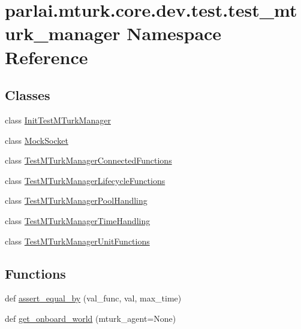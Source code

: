 \hypertarget{namespaceparlai_1_1mturk_1_1core_1_1dev_1_1test_1_1test__mturk__manager}{}\section{parlai.\+mturk.\+core.\+dev.\+test.\+test\+\_\+mturk\+\_\+manager Namespace Reference}
\label{namespaceparlai_1_1mturk_1_1core_1_1dev_1_1test_1_1test__mturk__manager}
\subsection*{Classes}
\begin{DoxyCompactItemize}
\item 
class \hyperlink{classparlai_1_1mturk_1_1core_1_1dev_1_1test_1_1test__mturk__manager_1_1InitTestMTurkManager}{Init\+Test\+M\+Turk\+Manager}
\item 
class \hyperlink{classparlai_1_1mturk_1_1core_1_1dev_1_1test_1_1test__mturk__manager_1_1MockSocket}{Mock\+Socket}
\item 
class \hyperlink{classparlai_1_1mturk_1_1core_1_1dev_1_1test_1_1test__mturk__manager_1_1TestMTurkManagerConnectedFunctions}{Test\+M\+Turk\+Manager\+Connected\+Functions}
\item 
class \hyperlink{classparlai_1_1mturk_1_1core_1_1dev_1_1test_1_1test__mturk__manager_1_1TestMTurkManagerLifecycleFunctions}{Test\+M\+Turk\+Manager\+Lifecycle\+Functions}
\item 
class \hyperlink{classparlai_1_1mturk_1_1core_1_1dev_1_1test_1_1test__mturk__manager_1_1TestMTurkManagerPoolHandling}{Test\+M\+Turk\+Manager\+Pool\+Handling}
\item 
class \hyperlink{classparlai_1_1mturk_1_1core_1_1dev_1_1test_1_1test__mturk__manager_1_1TestMTurkManagerTimeHandling}{Test\+M\+Turk\+Manager\+Time\+Handling}
\item 
class \hyperlink{classparlai_1_1mturk_1_1core_1_1dev_1_1test_1_1test__mturk__manager_1_1TestMTurkManagerUnitFunctions}{Test\+M\+Turk\+Manager\+Unit\+Functions}
\end{DoxyCompactItemize}
\subsection*{Functions}
\begin{DoxyCompactItemize}
\item 
def \hyperlink{namespaceparlai_1_1mturk_1_1core_1_1dev_1_1test_1_1test__mturk__manager_a618dc967426525fdbd87e484bee59c1b}{assert\+\_\+equal\+\_\+by} (val\+\_\+func, val, max\+\_\+time)
\item 
def \hyperlink{namespaceparlai_1_1mturk_1_1core_1_1dev_1_1test_1_1test__mturk__manager_aafd69ff9f051e4dd382a610b58f65710}{get\+\_\+onboard\+\_\+world} (mturk\+\_\+agent=None)
\end{DoxyCompactItemize}
